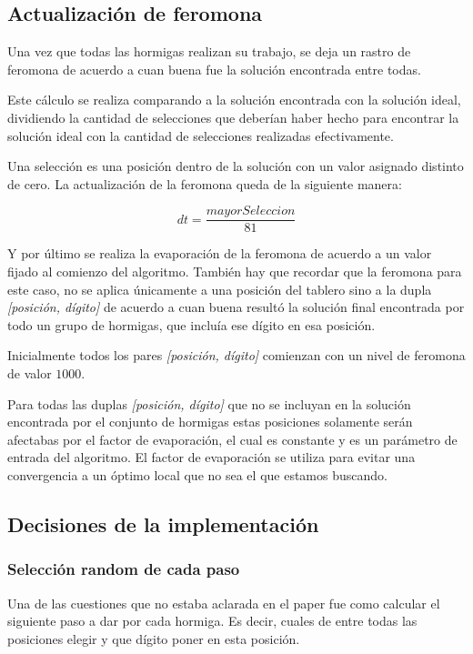 \documentclass[a4paper,spanish]{article}
\begin{document}
\subsection{Actualización de feromona}

Una vez que todas las hormigas realizan su trabajo, se deja un rastro de feromona de acuerdo a cuan
buena fue la solución encontrada entre todas.

Este cálculo se realiza comparando a la solución encontrada con la solución ideal, dividiendo la
cantidad de selecciones que deberían haber hecho para encontrar la solución ideal con la cantidad
de selecciones realizadas efectivamente.

Una selección es una posición dentro de la solución con un valor asignado distinto de cero. La
actualización de la feromona queda de la siguiente manera:

\begin{equation}
	dt = \dfrac{mayorSeleccion}{81}
\end{equation}


Y por último se realiza la evaporación de la feromona de acuerdo a un valor fijado al comienzo del
algoritmo. También hay que recordar que la feromona para este caso, no se aplica únicamente a una
posición del tablero sino a la dupla \emph{[posición, dígito]} de acuerdo a cuan buena resultó la solución
final encontrada por todo un grupo de hormigas, que incluía ese dígito en esa posición.

Inicialmente todos los pares \emph{[posición, dígito]} comienzan con un nivel de feromona de valor $1000$.

Para todas las duplas \emph{[posición, dígito]} que no se incluyan en la solución encontrada por el conjunto
de hormigas estas posiciones solamente serán afectabas por el factor de evaporación, el cual es
constante y es un parámetro de entrada del algoritmo. El factor de evaporación se utiliza para evitar
una convergencia a un óptimo local que no sea el que estamos buscando.

\subsection{Decisiones de la implementación}

\subsubsection{Selección random de cada paso}

Una de las cuestiones que no estaba aclarada en el paper fue como calcular el siguiente paso a dar
por cada hormiga. Es decir, cuales de entre todas las posiciones elegir y que dígito poner en esta posición.
\end{document}
